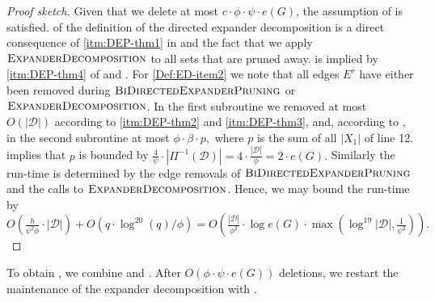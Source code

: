 \documentclass[11pt]{article}
\begin{document}
\begin{proof}[Proof sketch]
    Given that we delete at most $c \cdot \phi \cdot \psi \cdot e(G)$, the assumption of  is satisfied.  of the definition of the directed expander decomposition is a direct consequence of \cref{itm:DEP-thm1} in  and the fact that we apply $\textsc{ExpanderDecomposition}$ to all sets that are pruned away.  is implied by \cref{itm:DEP-thm4} of  and . For \cref{Def:ED-item2} we note that all edges $E^r$ have either been removed during $\textsc{BiDirectedExpanderPruning}$ or $\textsc{ExpanderDecomposition}$. In the first subroutine we removed at most $O\left(|\mathcal{D}|\right)$ according to \cref{itm:DEP-thm2} and \cref{itm:DEP-thm3}, and, according to , in the second subroutine at most $\phi \cdot \beta \cdot p,$ where $p$ is the sum of all $|X_1|$ of line 12.  implies that $p$ is bounded by $\frac{4}{\psi} \cdot \left|\Pi^{-1}(\mathcal{D})\right| = 4 \cdot \frac{|\mathcal{D}|}{\phi} = 2 \cdot e(G).$ Similarly the run-time is determined by the edge removals of $\textsc{BiDirectedExpanderPruning}$ and the calls to $\textsc{ExpanderDecomposition}$. Hence, we may bound the run-time by $O\left(\frac{h}{\psi^2 \phi} \cdot |\mathcal{D}|\right) + O\left( q \cdot \log^{20}(q)/\phi\right) = O\left(\frac{|\mathcal{D}|}{\phi^2} \cdot \log e(G) \cdot \max\left(\log^{19}|\mathcal{D}|, \frac{1}{\psi^2}\right)\right).$
\end{proof}

To obtain , we combine  and . After $O(\phi \cdot \psi \cdot e(G))$ deletions, we restart the maintenance of the expander decomposition with .

 
\end{document}
